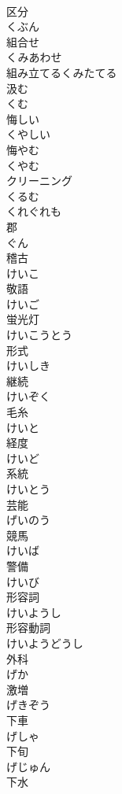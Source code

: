 \documentclass[8pt]{extreport}
\begin{document}
\begin{CJK}{UTF8}{min}
\\	区分 
\\	くぶん	
\\	組合せ 
\\	くみあわせ	
\\	組み立てるくみたてる	
\\	汲む 
\\	くむ	
\\	悔しい 
\\	くやしい	
\\	悔やむ 
\\	くやむ	
\\	クリーニング	
\\	くるむ	
\\	くれぐれも	
\\	郡 
\\	ぐん	
\\	稽古 
\\	けいこ	
\\	敬語 
\\	けいご	
\\	蛍光灯 
\\	けいこうとう	
\\	形式 
\\	けいしき	
\\	継続 
\\	けいぞく	
\\	毛糸 
\\	けいと	
\\	経度 
\\	けいど	
\\	系統 
\\	けいとう	
\\	芸能 
\\	げいのう	
\\	競馬 
\\	けいば	
\\	警備 
\\	けいび	
\\	形容詞 
\\	けいようし	
\\	形容動詞 
\\	けいようどうし	
\\	外科 
\\	げか	
\\	激増 
\\	げきぞう	
\\	下車 
\\	げしゃ	
\\	下旬 
\\	げじゅん	
\\	下水 

\end{CJK}
\end{document}
